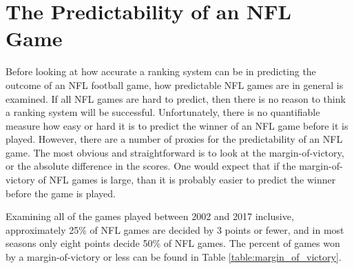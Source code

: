\documentclass[11pt]{article}
\begin{document}
\section{The Predictability of an NFL Game}

Before looking at how accurate a ranking system can be in predicting the outcome of an NFL football game, how predictable NFL games are in general is examined. If all NFL games are hard to predict, then there is no reason to think a ranking system will be successful. Unfortunately, there is no quantifiable measure how easy or hard it is to predict the winner of an NFL game before it is played. However, there are a number of proxies for the predictability of an NFL game. The most obvious and straightforward is to look at the margin-of-victory, or the absolute difference in the scores. One would expect that if the margin-of-victory of NFL games is large, than it is probably easier to predict the winner before the game is played.

Examining all of the games played between 2002 and 2017 inclusive, approximately 25\% of NFL games are decided by 3 points or fewer, and in most seasons only eight points decide 50\% of NFL games. The percent of games won by a margin-of-victory or less can be found in Table \ref{table:margin_of_victory}.
\end{document}

